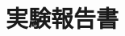 \documentclass[uplatex,dvipdfmx]{jsarticle}
\begin{document}
\title{実験報告書}
\author{}
\maketitle


\end{document}
